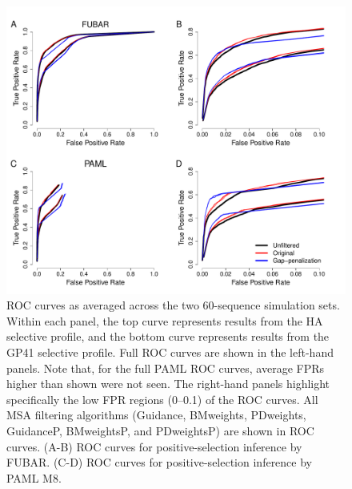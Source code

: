 \documentclass[11pt]{article}
\begin{document}
\bigskip

\begin{figure}[H]
\centerline{\includegraphics[width=6in]{Figures/ROC_prk.pdf}}
\caption{\label{roc} ROC curves as averaged across the two 60-sequence simulation sets. Within each panel, the top curve represents results from the HA selective profile, and the bottom curve represents results from the GP41 selective profile. Full ROC curves are shown in the left-hand panels. Note that, for the full PAML ROC curves, average FPRs higher than shown were not seen. The right-hand panels highlight specifically the low FPR regions (0--0.1) of the ROC curves. All MSA filtering algorithms (Guidance, BMweights, PDweights, GuidanceP, BMweightsP, and PDweightsP) are shown in ROC curves. (A-B) ROC curves for positive-selection inference by FUBAR. (C-D) ROC curves for positive-selection inference by PAML M8.}
\end{figure}
\end{document}
